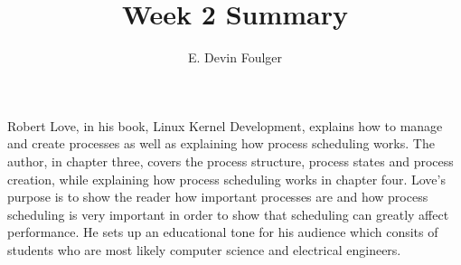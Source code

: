 \documentclass[journal, 10pt]{article}
\def\name{E. Devin Foulger}
\begin{document}
\title{Week 2 Summary}
\author{\name}
\date{} %

\maketitle

Robert Love, in his book, Linux Kernel Development, explains how to manage and create processes as well as 
explaining how process scheduling works. The author, in chapter three, covers the process structure, process states 
and process creation, while explaining how process scheduling works in chapter four. Love's purpose is to show the 
reader how important processes are and how process scheduling is very important in order to show that scheduling can
greatly affect performance. He sets up an educational tone for his audience which consits of students who are most 
likely computer science and electrical engineers.
\end{document}
